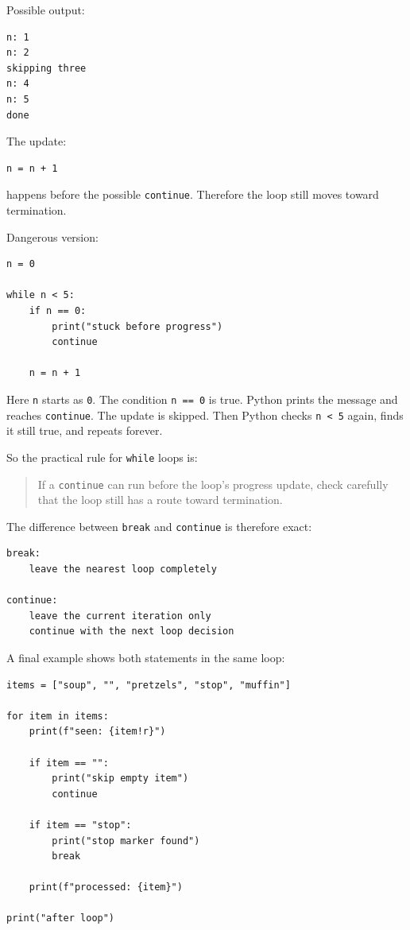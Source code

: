 Possible output:

\begin{verbatim}
n: 1
n: 2
skipping three
n: 4
n: 5
done
\end{verbatim}

The update:

\begin{verbatim}
n = n + 1
\end{verbatim}

happens before the possible \texttt{continue}. Therefore the loop still moves toward termination.

Dangerous version:

\begin{verbatim}
n = 0

while n < 5:
    if n == 0:
        print("stuck before progress")
        continue

    n = n + 1
\end{verbatim}

Here \texttt{n} starts as \texttt{0}. The condition \texttt{n == 0} is true. Python prints the message and reaches \texttt{continue}. The update is skipped. Then Python checks \texttt{n < 5} again, finds it still true, and repeats forever.

So the practical rule for \texttt{while} loops is:

\begin{quote}
If a \texttt{continue} can run before the loop's progress update, check carefully that the loop still has a route toward termination.
\end{quote}

The difference between \texttt{break} and \texttt{continue} is therefore exact:

\begin{verbatim}
break:
    leave the nearest loop completely

continue:
    leave the current iteration only
    continue with the next loop decision
\end{verbatim}

A final example shows both statements in the same loop:

\begin{verbatim}
items = ["soup", "", "pretzels", "stop", "muffin"]

for item in items:
    print(f"seen: {item!r}")

    if item == "":
        print("skip empty item")
        continue

    if item == "stop":
        print("stop marker found")
        break

    print(f"processed: {item}")

print("after loop")
\end{verbatim}


